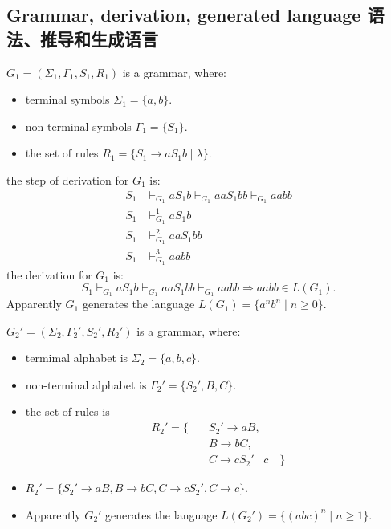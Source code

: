 \documentclass[a4paper,11pt,utf8]{article}
\newcommand{\lineindent}{\hspace*{\parindent}}
\begin{document}
\subsection{Grammar, derivation, generated language 语法、推导和生成语言}
\begin{tcolorbox}[title=example 1,colback=white,colframe=black,width=\textwidth,arc=0pt]
    $G_1 = (\Sigma_1, \Gamma_1, S_1, R_1)$ is a grammar, where:
    \begin{itemize}
        \item terminal symbols $\Sigma_1 = \{a,b\}$.
        \item non-terminal symbols $\Gamma_1 = \{S_1\}$.
        \item the set of rules $R_1 = \{S_1 \to a S_1 b \mid \lambda\}$.
    \end{itemize}
    \lineindent the step of derivation for $G_1$ is:
    \[
        \begin{aligned}
            S_1 &\vdash_{G_1} a S_1 b \vdash_{G_1} a a S_1 b b \vdash_{G_1} aabb \\[1ex]
            S_1 &\vdash_{G_1}^1 a S_1 b \\[1ex]
            S_1 &\vdash_{G_1}^2 aa S_1 bb \\[1ex]
            S_1 &\vdash_{G_1}^3 aabb
        \end{aligned}
    \]
    \lineindent the derivation for $G_1$ is:
    \[
        S_1 \vdash_{G_1} a S_1 b \vdash_{G_1} aa S_1 bb \vdash_{G_1} aabb \Rightarrow aabb \in L(G_1).
    \]
    Apparently $G_1$ generates the language $L(G_1) = \{a^nb^n \mid n \geq 0\}$.
\end{tcolorbox}
\begin{tcolorbox}[title=example 2,colback=white,colframe=black,width=\textwidth,arc=0pt]
    $G_2' = (\Sigma_2, \Gamma_2', S_2', R_2')$ is a grammar, where:
    \begin{itemize}
        \item termimal alphabet is $\Sigma_2 = \{a,b,c\}$.
        \item non-terminal alphabet is $\Gamma_2' = \{S_2', B,C\}$.
        \item the set of rules is \[
            \begin{aligned}
                R_2' = \{ \quad & S_2' \to aB, \\[1ex]
                & B \to bC, \\[1ex]
                & C \to c S_2' \mid c \quad \}
            \end{aligned}
        \]
        \item $R_2' = \{S_2' \to aB, B \to bC, C \to cS_2', C \to c\}$.
        \item Apparently $G_2'$ generates the language $L(G_2') = \{(abc)^n \mid n \geq 1\}$.
    \end{itemize}
\end{tcolorbox}
\end{document}
